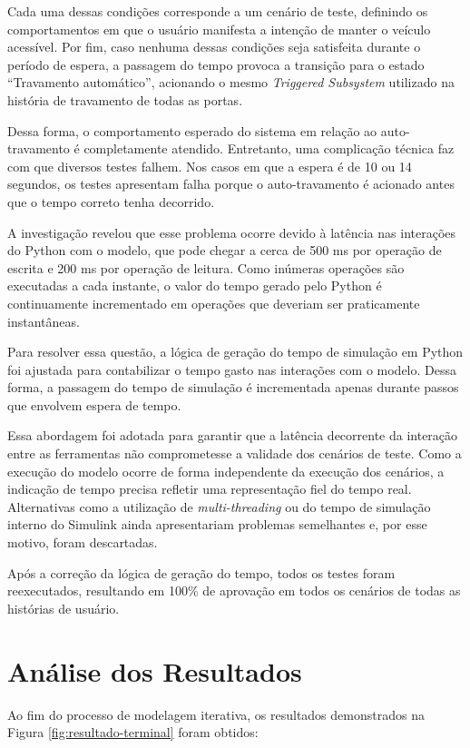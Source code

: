 Cada uma dessas condições corresponde a um cenário de teste, definindo os comportamentos em que o usuário manifesta a intenção de manter o veículo acessível. Por fim, 
caso nenhuma dessas condições seja satisfeita durante o período de espera, a passagem do tempo provoca a transição para o estado ``Travamento automático'', acionando 
o mesmo \textit{Triggered Subsystem} utilizado na história de travamento de todas as portas.

Dessa forma, o comportamento esperado do sistema em relação ao auto-travamento é completamente atendido. Entretanto, uma complicação técnica faz com que diversos 
testes falhem. Nos casos em que a espera é de 10 ou 14 segundos, os testes apresentam falha porque o auto-travamento é acionado antes que o tempo correto tenha decorrido.

A investigação revelou que esse problema ocorre devido à latência nas interações do Python com o modelo, que pode chegar a cerca de 500 ms por operação de escrita e 
200 ms por operação de leitura. Como inúmeras operações são executadas a cada instante, o valor do tempo gerado pelo Python é continuamente incrementado em operações 
que deveriam ser praticamente instantâneas.

Para resolver essa questão, a lógica de geração do tempo de simulação em Python foi ajustada para contabilizar o tempo gasto nas interações com o modelo. Dessa forma, 
a passagem do tempo de simulação é incrementada apenas durante passos que envolvem espera de tempo.

Essa abordagem foi adotada para garantir que a latência decorrente da interação entre as ferramentas não comprometesse a validade dos cenários de teste. Como a execução 
do modelo ocorre de forma independente da execução dos cenários, a indicação de tempo precisa refletir uma representação fiel do tempo real. Alternativas como a 
utilização de \textit{multi-threading} ou do tempo de simulação interno do Simulink ainda apresentariam problemas semelhantes e, por esse motivo, foram descartadas.

Após a correção da lógica de geração do tempo, todos os testes foram reexecutados, resultando em 100\% de aprovação em todos os cenários de todas as histórias de usuário.

\section{Análise dos Resultados}

Ao fim do processo de modelagem iterativa, os resultados demonstrados na Figura \ref{fig:resultado-terminal} foram obtidos: 

